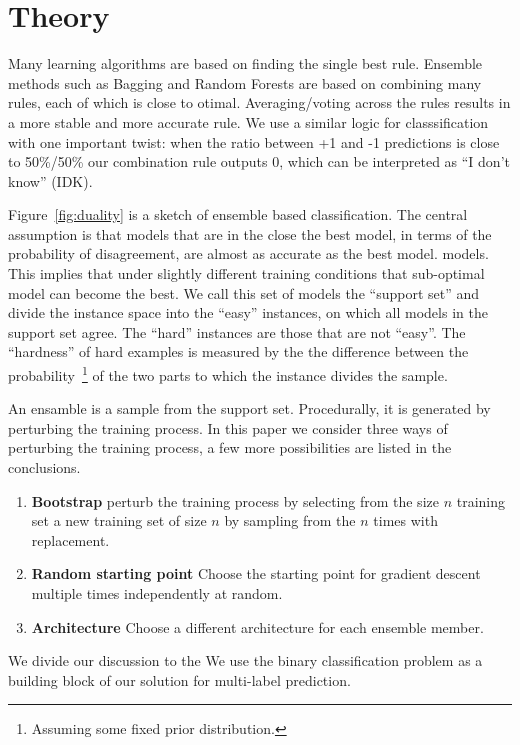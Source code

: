 \documentclass{article}
\begin{document}
\section{Theory}

Many learning algorithms are based on finding the single best
rule. Ensemble methods such as Bagging and Random Forests are based on
combining many rules, each of which is close to
otimal. Averaging/voting across the rules results in a more stable and
more accurate rule.  We use a similar logic for classsification with
one important twist: when the ratio between +1 and -1 predictions is
close to 50\%/50\% our combination rule outputs 0, which can be
interpreted as ``I don't know'' (IDK).

Figure~\ref{fig:duality} is a sketch of ensemble based classification.
The central assumption is that models that are in the close the best
model, in terms of the probability of disagreement, are almost as
accurate as the best model.  models. This implies that under slightly
different training conditions that sub-optimal model can become the
best. We call this set of models the ``support set'' and divide the
instance space into the ``easy'' instances, on which all models in the
support set agree. The ``hard'' instances are those that are not
``easy''. The ``hardness'' of hard examples is measured by the the
difference between the probability~\footnote{Assuming some fixed prior
  distribution.} of the two parts to which the instance divides the
sample.

An ensamble is a sample from the support set. Procedurally, it is generated by
perturbing the training process. In this paper we consider three ways of perturbing the training process, a few more possibilities are listed in the conclusions.
\begin{enumerate}
\item {\bf Bootstrap} perturb the training process by selecting from the size $n$ training set a new training set of size $n$ by sampling from the $n$ times with replacement.
\item{\bf Random starting point} Choose the starting point for gradient descent multiple times independently at random.
\item{\bf Architecture} Choose a different architecture for each ensemble member.
\end{enumerate}

We divide our discussion to the 
We use the binary classification problem as a building block of our solution for multi-label prediction.
\end{document}
